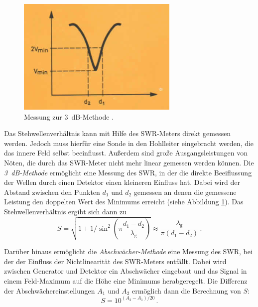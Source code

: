 \begin{figure}
    \centering
    \includegraphics[width=0.9\linewidth]{img/3db.png}
    \caption{
        Messung zur \SI{3}{dB}-Methode \cite{V53}.
    }
    \label{fig:3db}
\end{figure}
Das Stehwellenverhältnis kann mit Hilfe des SWR-Meters direkt gemessen werden.
Jedoch muss hierfür eine Sonde in den Hohlleiter eingebracht werden, die
das innere Feld selbst beeinflusst.
Außerdem sind große Ausgangsleistungen von Nöten, die durch das SWR-Meter
nicht mehr linear gemessen werden können.
Die \emph{\SI{3}{dB}-Methode} ermöglicht eine Messung des SWR, in der die
direkte Beeiflussung der Wellen durch einen Detektor einen kleineren Einfluss
hat.
Dabei wird der Abstand zwischen den Punkten $d_1$ und $d_2$ gemessen an denen
die gemessene Leistung den doppelten Wert des Minimums erreicht
(siehe Abbildung \ref{fig:3db}).
Das Stehwellenverhältnis ergibt sich dann zu
\begin{equation}
    \label{3dbswr}
    S = \sqrt{1 + 1/\sin^2\left(\pi\frac{d_1-d_2}{\lambda_\text{g}}\right)}
    \approx \frac{\lambda_\text{g}}{\pi (d_1-d_2)}\,.
\end{equation}

Darüber hinaus ermöglicht die \emph{Abschwächer-Methode} eine Messung des
SWR, bei der der Einfluss der Nichtlinearität des SWR-Meters entfällt.
Dabei wird zwischen Generator und Detektor ein Abschwächer eingebaut und das
Signal in einem Feld-Maximum auf die Höhe eine Minimums herabgeregelt.
Die Differenz der Abschwächereinstellungen $A_1$ und $A_2$ ermöglich dann die
Berechnung von $S$:
\begin{equation}
    \label{abschwaecher}
    S = 10^{(A_2-A_1)/20}\,.
\end{equation}
\clearpage
